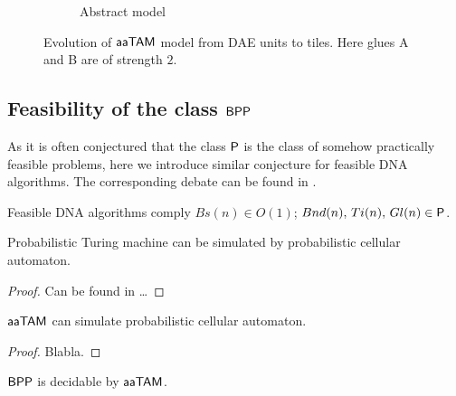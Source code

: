 \begin{figure}[H]
\begin{center}
\begin{subfigure}[b]{0.190\textwidth}
		\caption{Abstract model}
		\label{fig:abstract_model}
	\end{subfigure}
	\caption{Evolution of $\myatam$ model from DAE units to tiles. Here glues {\sf A} and {\sf B} are of strength $2$.}
	\label{fig:evolution}
\end{center}
\end{figure}

\subsection{Feasibility of the class $\BPP$}
	
	As it is often conjectured that the class $\P$ is the class of somehow practically feasible problems, here we introduce similar conjecture for feasible DNA algorithms. The corresponding debate can be found in \cite{book_comp}. %
	
	\begin{conj}   %
		Feasible DNA algorithms comply $Bs(n)\in O(1)$; $Bnd(n),\,Ti(n),\,Gl(n)\in \P$.   %
	\end{conj}
	
	\begin{thm}   %
		Probabilistic Turing machine can be simulated by probabilistic cellular automaton.
	\end{thm}
	
	\begin{proof}
		Can be found in \ldots
	\end{proof}
	
	\begin{thm}   %
		$\myatam$ can simulate probabilistic cellular automaton.
	\end{thm}
	
	\begin{proof}
		Blabla. %
	\end{proof}
	
	\begin{cor}
		$\BPP$ is decidable by $\myatam$.
	\end{cor}
	
